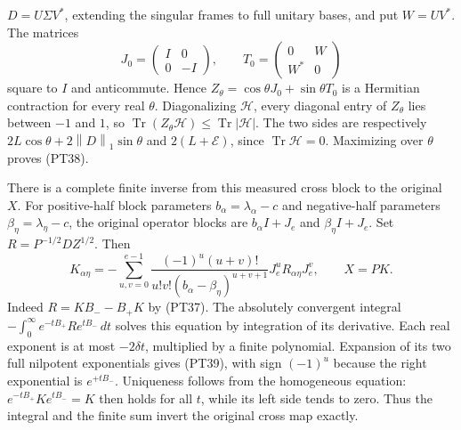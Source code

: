 \documentclass[11pt,a4paper]{article}
\providecommand{\Tr}{\operatorname{Tr}}
\providecommand{\norm}[1]{\left\lVert#1\right\rVert}
\begin{document}
\(D=U\Sigma V^*\), extending the singular frames to full unitary
bases, and put \(W=UV^*\). The matrices
\[
 J_0=\begin{pmatrix}I&0\\0&-I\end{pmatrix},\qquad
 T_0=\begin{pmatrix}0&W\\W^*&0\end{pmatrix}
\]
square to \(I\) and anticommute. Hence
\(Z_\theta=\cos\theta J_0+\sin\theta T_0\) is a Hermitian
contraction for every real \(\theta\). Diagonalizing
\(\mathcal H\), every diagonal entry of \(Z_\theta\) lies
between \(-1\) and \(1\), so
\(\Tr(Z_\theta\mathcal H)\le\Tr|\mathcal H|\).
The two sides are respectively
\(2L\cos\theta+2\norm D_1\sin\theta\) and
\(2(L+\mathcal E)\), since \(\Tr\mathcal H=0\).
Maximizing over \(\theta\) proves (PT38).

There is a complete finite inverse from this measured cross block
to the original \(X\). For positive-half block parameters
\(b_\alpha=\lambda_\alpha-c\) and negative-half parameters
\(\beta_\eta=\lambda_\eta-c\), the original operator blocks
are \(b_\alpha I+J_e\) and \(\beta_\eta I+J_e\).
Set \(R=P^{-1/2}DZ^{1/2}\). Then
\begin{equation}\tag{PT39}
 K_{\alpha\eta}
 =-\sum_{u,v=0}^{e-1}
 \frac{(-1)^u(u+v)!}
      {u!v!(b_\alpha-\beta_\eta)^{u+v+1}}
 J_e^uR_{\alpha\eta}J_e^v,\qquad X=PK.
\end{equation}
Indeed \(R=KB_--B_+K\) by (PT37). The absolutely convergent
integral \(-\int_0^\infty e^{-tB_+}Re^{tB_-}\,dt\) solves
this equation by integration of its derivative. Each real
exponent is at most \(-2\delta t\), multiplied by a finite
polynomial. Expansion of its two full nilpotent exponentials
gives (PT39), with sign \((-1)^u\) because the right exponential
is \(e^{+tB_-}\). Uniqueness follows from the homogeneous
equation: \(e^{-tB_+}Ke^{tB_-}=K\) then holds for all \(t\),
while its left side tends to zero. Thus the integral and the
finite sum invert the original cross map exactly.
\end{document}
